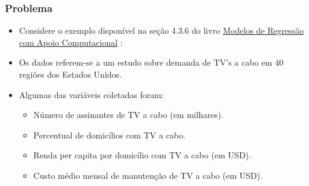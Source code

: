 \documentclass[10pt,
  aspectratio=169,
  serif,
  mathserif,
  professionalfont,
  compress,
  handout,
  ]{beamer}\usepackage[]{graphicx}\usepackage[]{color}
\begin{document}

\begin{frame}

\frametitle{Problema}

\begin{itemize}
  
  \itemsep 2ex
  
  \item Considere o exemplo disponível na seção 4.3.6 do livro \href{https://www.ime.usp.br/~giapaula/texto_2013.pdf}{Modelos de Regressão com Apoio Computacional} \cite{paula}:
  
  \item Os dados referem-se a um estudo sobre demanda de TV's a cabo em 40 regiões dos Estados Unidos. 
  
  \item Algumas das variáveis coletadas foram:
    
    \begin{itemize}

        \item Número de assinantes de TV a cabo (em milhares).

        \item Percentual de domicílios com TV a cabo.

        \item Renda per capita por domicílio com TV a cabo (em USD).

        \item Custo médio mensal de manutenção de TV a cabo (em USD).

\end{itemize}
  
\end{itemize}

\end{frame}

\end{document}
